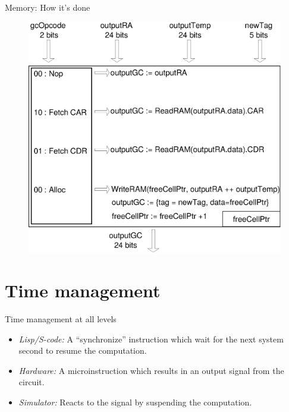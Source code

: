 \documentclass{beamer}
\begin{document}
\begin{frame}{Memory: How it's done}
\begin{figure}[h]
\center
\includegraphics[scale=0.40]{GC.eps}
\end{figure}
\end{frame}


\section{Time management}

\begin{frame}{Time management at all levels}
\begin{itemize}
\item \emph{Lisp/S-code:} A \enquote{synchronize} instruction which wait for the next
system second to resume the computation.
\item \emph{Hardware:} A microinstruction which results in an output signal from
the circuit.
\item \emph{Simulator:} Reacts to the signal by suspending the computation. 
\end{itemize}
\end{frame}
\end{document}
